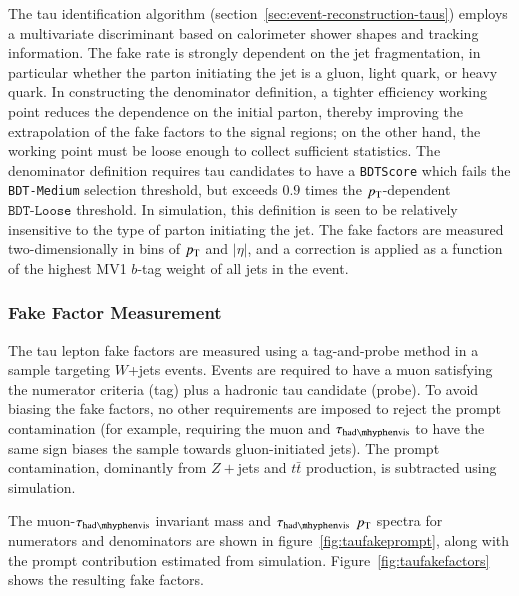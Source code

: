 The tau identification algorithm (section~\ref{sec:event-reconstruction-taus}) employs a multivariate discriminant based on calorimeter shower shapes and tracking information. The fake rate is strongly dependent on the jet fragmentation, in particular whether the parton initiating the jet is a gluon, light quark, or heavy quark. In constructing the denominator definition, a tighter efficiency working point reduces the dependence on the initial parton, thereby improving the extrapolation of the fake factors to the signal regions; on the other hand, the working point must be loose enough to collect sufficient statistics. The denominator definition requires tau candidates to have a \texttt{BDTScore} which fails the \texttt{BDT-Medium} selection threshold, but exceeds $0.9$ times the $p_{\text{T}}$-dependent $\texttt{BDT-Loose}$ threshold. In simulation, this definition is seen to be relatively insensitive to the type of parton initiating the jet. The fake factors are measured two-dimensionally in bins of $p_{\text{T}}$ and $|\eta|$, and a correction is applied as a function of the highest MV1 $b$-tag weight of all jets in the event. 


\subsubsection{Fake Factor Measurement}\label{sec:ff-tau-measurement}
The tau lepton fake factors are measured using a tag-and-probe method in a sample targeting $W$+jets events. Events are required to have a muon satisfying the numerator criteria (tag) plus a hadronic tau candidate (probe). To avoid biasing the fake factors, no other requirements are imposed to reject the prompt contamination (for example, requiring the muon and $\tauhadvis$ to have the same sign biases the sample towards gluon-initiated jets). The prompt contamination, dominantly from $Z+$jets and $t\bar{t}$ production, is subtracted using simulation. 

The muon-$\tauhadvis$ invariant mass and $\tauhadvis$ $p_{\text{T}}$ spectra for numerators and denominators are shown in figure~\ref{fig:taufakeprompt}, along with the prompt contribution estimated from simulation. Figure~\ref{fig:taufakefactors} shows the resulting fake factors.


